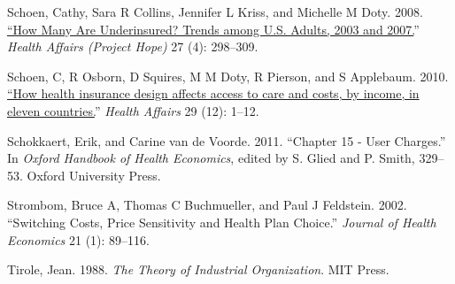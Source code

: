 \documentclass[a4paper,12pt]{article}
\begin{document}
\hypertarget{citeproc_bib_item_37}{Schoen, Cathy, Sara R Collins, Jennifer L Kriss, and Michelle M Doty. 2008. \href{https://www.ncbi.nlm.nih.gov/pubmed/18544591}{“How Many Are Underinsured? Trends among U.S. Adults, 2003 and 2007.}” \textit{Health Affairs (Project Hope)} 27 (4): 298–309.}

\hypertarget{citeproc_bib_item_38}{Schoen, C, R Osborn, D Squires, M M Doty, R Pierson, and S Applebaum. 2010. \href{https://www.ncbi.nlm.nih.gov/pubmed/21088012}{“How health insurance design affects access to care and costs, by income, in eleven countries.}” \textit{Health Affairs} 29 (12): 1–12.}

\hypertarget{citeproc_bib_item_39}{Schokkaert, Erik, and Carine van de Voorde. 2011. “Chapter 15 - User Charges.” In \textit{Oxford Handbook of Health Economics}, edited by S. Glied and P. Smith, 329–53. Oxford University Press.}

\hypertarget{citeproc_bib_item_40}{Strombom, Bruce A, Thomas C Buchmueller, and Paul J Feldstein. 2002. “Switching Costs, Price Sensitivity and Health Plan Choice.” \textit{Journal of Health Economics} 21 (1): 89–116.}

\hypertarget{citeproc_bib_item_41}{Tirole, Jean. 1988. \textit{The Theory of Industrial Organization}. MIT Press.}\bigskip



\newpage
\appendix



\setcounter{table}{0}
\renewcommand{\thetable}{\thesection\arabic{table}}
\end{document}
